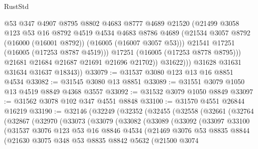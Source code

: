 \begin{lexlean}{RustStd}
\begin{coremodule}
                    @53
                    @347
                    @4907
                    @8795
                    @8802
                    @4683
                    @8777
                    @4689
                    @21520
                    (@21499
                      @3058
                      @123
                      @53
                      @16
                      @8792
                      @4519
                      @4534
                      @4683
                      @8786
                      @4689
                      (@21534 @3057 @8792 (@16000 (@16001 @8792)) (@16005 (@16007 @3057 @53)))
                      @21541
                      @17251
                      (@16005 (@17253 @8787 @4519)))
                    @17251
                    (@16005 (@17253 @8778 @8795)))
                  @21681
                  @21684
                  @21687
                  @21691
                  @21696
                  @21702))
              @31622)))
        @31628
        @31631
        @31634
        @31637
        @18343))
@33079 := @31537 @3080 @123 @13 @16 @8851 @4534
@33082 := @31545 @3080 @13 @8851
@33089 := @31551 @3079 @1050 @13 @4519 @8849 @4368 @3557
@33092 := @31532 @3079 @1050 @8849
@33097 := @31562 @3078 @102 @347 @4551 @8848
@33100 := @31570 @4551 @26844 @16219
@33190 := @32146
    (@32249
      (@32352
        (@32455
          (@32558
            (@32661
              (@32764
                (@32867
                  (@32970
                    (@33073
                      (@33079
                        (@33082
                          (@33089
                            (@33092
                              (@33097
                                @33100
                                (@31537
                                  @3076
                                  @123
                                  @53
                                  @16
                                  @8846
                                  @4534
                                  (@21469
                                    @3076
                                    @53
                                    @8835
                                    @8844
                                    (@21630
                                      @3075
                                      @348
                                      @53
                                      @8835
                                      @8842
                                      @5632
                                      (@21500
                                        @3074

\end{coremodule}
\end{lexlean}
